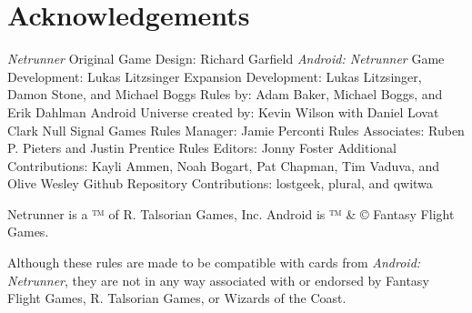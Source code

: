 \documentclass{article}
\begin{document}


\newpage

\section*{Acknowledgements}

\begin{outline}[enumerate]
\1 \emph{Netrunner} Original Game Design: Richard Garfield
\1 \emph{Android: Netrunner}
  \2 Game Development: Lukas Litzsinger
  \2 Expansion Development: Lukas Litzsinger, Damon Stone, and Michael Boggs
  \2 Rules by: Adam Baker, Michael Boggs, and Erik Dahlman
  \2 Android Universe created by: Kevin Wilson with Daniel Lovat Clark
\1 Null Signal Games
  \2 Rules Manager: Jamie Perconti
  \2 Rules Associates: Ruben P. Pieters and Justin Prentice
  \2 Rules Editors: Jonny Foster
  \2 Additional Contributions: Kayli Ammen, Noah Bogart, Pat Chapman, Tim Vaduva, and Olive Wesley
\1 Github Repository Contributions: lostgeek, plural, and qwitwa
\end{outline}

\noindent
Netrunner is a ™ of R. Talsorian Games, Inc. Android is ™ \& © Fantasy Flight Games.

\noindent
Although these rules are made to be compatible with cards from \emph{Android: Netrunner}, they are not in any way associated with or endorsed by Fantasy Flight Games, R. Talsorian Games, or Wizards of the Coast.
\end{document}
